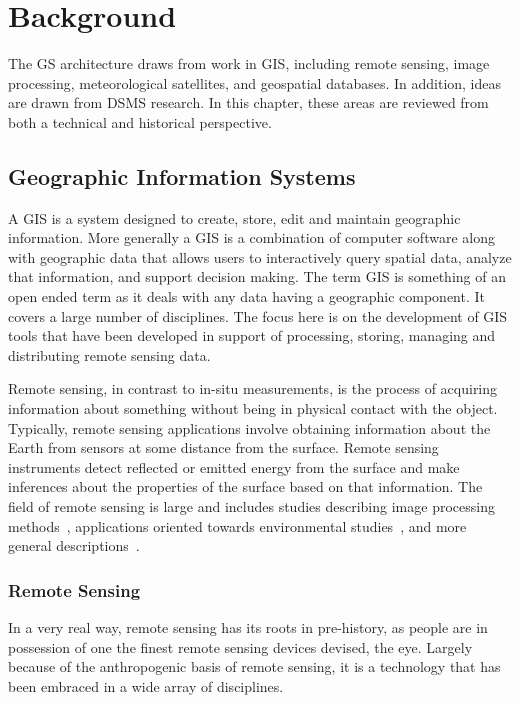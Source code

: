 \documentclass{ucdthesis}       %
\begin{document}
\chapter{Background}
\label{cha:background}


The \ac{GS} architecture draws from work in \acf{GIS}, including remote
sensing, image processing, meteorological satellites, and geospatial
databases.  In addition, ideas are drawn from \acf{DSMS} research.  In
this chapter, these areas are reviewed from both a technical and
historical perspective.

\section{Geographic Information Systems}

A \acf{GIS} is a system designed to create, store, edit and maintain
geographic information.  More generally a \ac{GIS} is a combination of
computer software along with geographic data that allows users to
interactively query spatial data, analyze that information, and
support decision making.  The term \acl{GIS} is something of an open
ended term as it deals with any data having a geographic component.
It covers a large number of disciplines.  The focus here is on the
development of \ac{GIS} tools that have been developed in support of
processing, storing, managing and distributing remote sensing data.

Remote sensing, in contrast to in-situ measurements, is the
process of acquiring information about something without being in
physical contact with the object.  Typically, remote sensing
applications involve obtaining information about the Earth from
sensors at some distance from the surface.  Remote sensing instruments
detect reflected or emitted energy from the surface and make
inferences about the properties of the surface based on that
information.  The field of remote sensing is large and includes
studies describing image processing
methods~\cite{mather04comput-proces}, applications oriented towards
environmental studies~\cite{curtis99introd-envir, hinton96gis-remot,
  skidm02envir-model}, and more general
descriptions~\cite{atkin99advan-remot}.

\subsection{Remote Sensing}

In a very real way, remote sensing has its roots in pre-history, as
people are in possession of one the finest remote sensing devices
devised, the eye.  Largely because of the anthropogenic basis of
remote sensing, it is a technology that has been embraced in a wide
array of disciplines.
\end{document}
